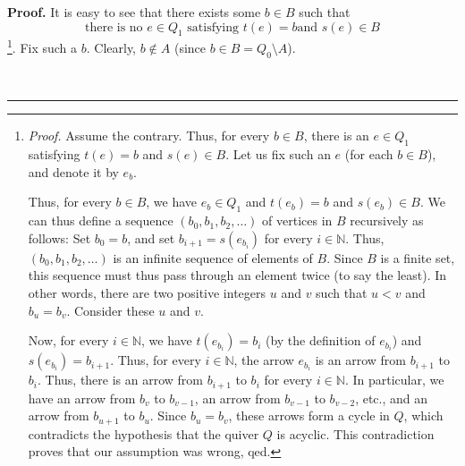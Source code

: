 \documentclass[numbers=enddot,12pt,final,onecolumn,notitlepage]{scrartcl}%
\numberwithin{exer}{section}
\theoremstyle{definition}
\newenvironment{proof}[1][Proof]{\noindent\textbf{#1.} }{\ \rule{0.5em}{0.5em}}
\begin{document}
\begin{proof}
It is easy to see that there exists some $b\in B$ such that%
\begin{equation}
\text{there is no }e\in Q_{1}\text{ satisfying }t\left(  e\right)  =b\text{
and }s\left(  e\right)  \in B \label{sol.ps1.exe.1.1.a.3}%
\end{equation}
\footnote{\textit{Proof.} Assume the contrary. Thus, for every $b\in B$, there
is an $e\in Q_{1}$ satisfying $t\left(  e\right)  =b$ and $s\left(  e\right)
\in B$. Let us fix such an $e$ (for each $b\in B$), and denote it by $e_{b}$.
\par
Thus, for every $b\in B$, we have $e_{b}\in Q_{1}$ and $t\left(  e_{b}\right)
=b$ and $s\left(  e_{b}\right)  \in B$. We can thus define a sequence $\left(
b_{0},b_{1},b_{2},\ldots\right)  $ of vertices in $B$ recursively as follows:
Set $b_{0}=b$, and set $b_{i+1}=s\left(  e_{b_{i}}\right)  $ for every
$i\in\mathbb{N}$. Thus, $\left(  b_{0},b_{1},b_{2},\ldots\right)  $ is an
infinite sequence of elements of $B$. Since $B$ is a finite set, this sequence
must thus pass through an element twice (to say the least). In other words,
there are two positive integers $u$ and $v$ such that $u<v$ and $b_{u}=b_{v}$.
Consider these $u$ and $v$.
\par
Now, for every $i\in\mathbb{N}$, we have $t\left(  e_{b_{i}}\right)  =b_{i}$
(by the definition of $e_{b_{i}}$) and $s\left(  e_{b_{i}}\right)  =b_{i+1}$.
Thus, for every $i\in\mathbb{N}$, the arrow $e_{b_{i}}$ is an arrow from
$b_{i+1}$ to $b_{i}$. Thus, there is an arrow from $b_{i+1}$ to $b_{i}$ for
every $i\in\mathbb{N}$. In particular, we have an arrow from $b_{v}$ to
$b_{v-1}$, an arrow from $b_{v-1}$ to $b_{v-2}$, etc., and an arrow from
$b_{u+1}$ to $b_{u}$. Since $b_{u}=b_{v}$, these arrows form a cycle in $Q$,
which contradicts the hypothesis that the quiver $Q$ is acyclic. This
contradiction proves that our assumption was wrong, qed.}. Fix such a $b$.
Clearly, $b\notin A$ (since $b\in B=Q_{0}\setminus A$).


\end{proof}
\end{document}
